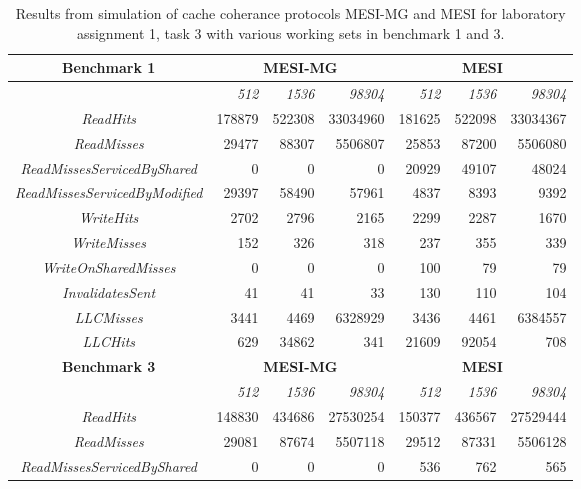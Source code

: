 \begin{table}[h]
	\caption{\label{tbl:lab1:task3}Results from simulation of cache coherance protocols MESI-MG and MESI for laboratory assignment 1, task 3 with various working sets in benchmark 1 and 3.}
    \begin{adjustwidth}{-2cm}{-2cm}  
        \begin{center}

			\begin{tabular}{| c | r r r | r r r|}
				\textbf{Benchmark 1}& \multicolumn{3}{c|}{\textbf{MESI-MG}} & \multicolumn{3}{c|}{\textbf{MESI}} \\
				\hline
				&\textit{512}&\textit{1536}&\textit{98304}&\textit{512}&\textit{1536}&\textit{98304}\\
				\hline
				\textit{ReadHits} & 178879 & 522308 & 33034960 & 181625 & 522098 & 33034367 \\
				\textit{ReadMisses} & 29477 & 88307 & 5506807 & 25853 & 87200 & 5506080 \\ 
				\textit{ReadMissesServicedByShared} & 0 & 0 & 0 & 20929 & 49107 & 48024 \\ 
				\textit{ReadMissesServicedByModified} & 29397 & 58490 & 57961 & 4837 & 8393 & 9392 \\ 
				\textit{WriteHits} & 2702 & 2796 & 2165 & 2299 & 2287 & 1670 \\
				\textit{WriteMisses} & 152 & 326 & 318 & 237 & 355 & 339 \\
				\textit{WriteOnSharedMisses} & 0 & 0 & 0 & 100 & 79 & 79 \\
				\textit{InvalidatesSent} & 41 & 41 & 33 & 130 & 110 & 104 \\
				\textit{LLCMisses} & 3441 & 4469 & 6328929 & 3436 & 4461 & 6384557 \\
				\textit{LLCHits} & 629 & 34862 & 341 & 21609 & 92054 & 708 \\
				\hline
				\textbf{Benchmark 3}& \multicolumn{3}{c|}{\textbf{MESI-MG}} & \multicolumn{3}{c|}{\textbf{MESI}} \\
				\hline
				&\textit{512}&\textit{1536}&\textit{98304}&\textit{512}&\textit{1536}&\textit{98304}\\
				\hline
				\textit{ReadHits} & 148830 & 434686 & 27530254 & 150377 & 436567 & 27529444 \\
				\textit{ReadMisses} & 29081 & 87674 & 5507118 & 29512 & 87331 & 5506128 \\ 
				\textit{ReadMissesServicedByShared} & 0 & 0 & 0 & 536 & 762 & 565 \\ 

\end{tabular}
\end{center}
\end{adjustwidth}
\end{table}
